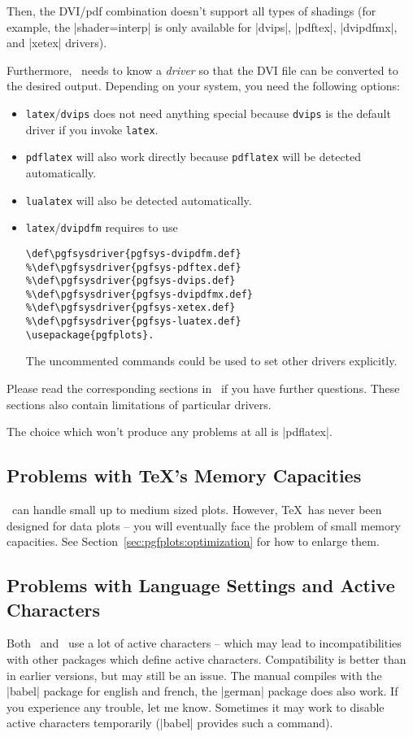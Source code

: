 Then, the DVI/pdf combination doesn't support all types of shadings (for example, the |shader=interp| is only available for |dvips|, |pdftex|, |dvipdfmx|, and |xetex| drivers).

Furthermore, \PGF\ needs to know a \emph{driver} so that the DVI file can be converted to the desired output. Depending on your system, you need the following options:
\begin{itemize}
	\item \lstinline!latex!/\lstinline!dvips! does not need anything special because \lstinline!dvips! is the default driver if you invoke \lstinline!latex!.
	\item \lstinline!pdflatex! will also work directly because \lstinline!pdflatex! will be detected automatically.
	\item \lstinline!lualatex! will also be detected automatically.
	\item \lstinline!latex!/\lstinline!dvipdfm! requires to use
\begin{verbatim}
\def\pgfsysdriver{pgfsys-dvipdfm.def}
%\def\pgfsysdriver{pgfsys-pdftex.def}
%\def\pgfsysdriver{pgfsys-dvips.def}
%\def\pgfsysdriver{pgfsys-dvipdfmx.def}
%\def\pgfsysdriver{pgfsys-xetex.def}
%\def\pgfsysdriver{pgfsys-luatex.def}
\usepackage{pgfplots}.
\end{verbatim}
	The uncommented commands could be used to set other drivers explicitly.
\end{itemize}
Please read the corresponding sections in~\cite[Section 7.2.1 and 7.2.2]{tikz} if you have further questions. These sections also contain limitations of particular drivers.

The choice which won't produce any problems at all is |pdflatex|.

\subsection{Problems with \TeX's Memory Capacities}
\PGFPlots\ can handle small up to medium sized plots. However, \TeX\ has never been designed for data plots -- you will eventually face the problem of small memory capacities. See Section~\ref{sec:pgfplots:optimization} for how to enlarge them.

\subsection{Problems with Language Settings and Active Characters}
Both \PGF\ and \PGFPlots\ use a lot of active characters -- which may lead to incompatibilities with other packages which define active characters. Compatibility is better than in earlier versions, but may still be an issue. The manual compiles with the |babel| package for english and french, the |german| package does also work. If you experience any trouble, let me know. Sometimes it may work to disable active characters temporarily (|babel| provides such a command).

